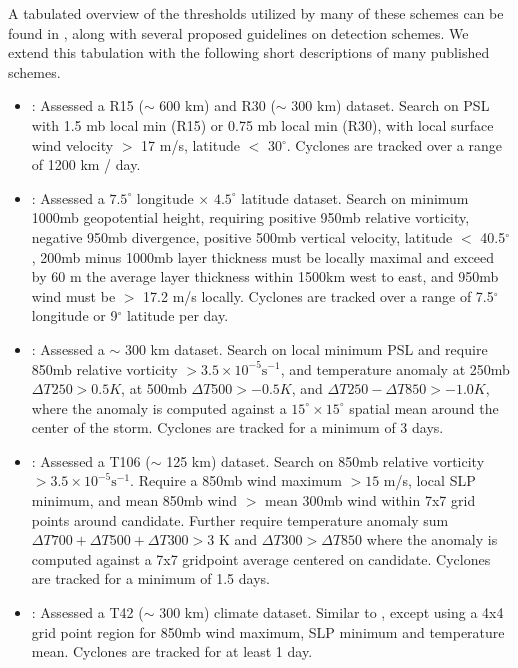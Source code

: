 \documentclass[gmdd, hvmath, online]{copernicus_discussions}
\begin{document}
A tabulated overview of the thresholds utilized by many of these schemes can be found in \cite{walsh2007objectively}, along with several proposed guidelines on detection schemes.  We extend this tabulation with the following short descriptions of many published schemes.

\begin{itemize}
\item \cite{broccoli1990existing}: Assessed a R15 ($\sim$ 600 km) and R30 ($\sim$ 300 km) dataset.  Search on PSL with 1.5 mb local min (R15) or 0.75 mb local min (R30), with local surface wind velocity $>$ 17 m/s, latitude $<$ 30$^\circ$.  Cyclones are tracked over a range of 1200 km / day.

\item \cite{wu1992gcm}: Assessed a $7.5^\circ$ longitude $\times$ $4.5^\circ$ latitude dataset.  Search on minimum 1000mb geopotential height, requiring positive 950mb relative vorticity, negative 950mb divergence, positive 500mb vertical velocity, latitude $<$ 40.5$^\circ$, 200mb minus 1000mb layer thickness must be locally maximal and exceed by 60 m the average layer thickness within 1500km west to east, and 950mb wind must be $>$ 17.2 m/s locally.  Cyclones are tracked over a range of 7.5$^\circ$ longitude or 9$^\circ$ latitude per day.

\item \cite{haarsma1993tropical}: Assessed a $\sim$ 300 km dataset.  Search on local minimum PSL and require 850mb relative vorticity $> 3.5 \times 10^{-5} \mbox{s}^{-1}$, and temperature anomaly at 250mb $\Delta T250 > 0.5 K$, at 500mb $\Delta T500 > -0.5 K$, and $\Delta T250 - \Delta T850 > -1.0 K$, where the anomaly is computed against a $15^\circ \times 15^\circ$ spatial mean around the center of the storm.  Cyclones are tracked for a minimum of 3 days.

\item \cite{bengtsson1995hurricane, bengtsson1996will}:  Assessed a T106 ($\sim$ 125 km) dataset.  Search on 850mb relative vorticity $> 3.5 \times 10^{-5} \mbox{s}^{-1}$.  Require a 850mb wind maximum $> 15$ m/s, local SLP minimum, and mean 850mb wind $>$ mean 300mb wind within 7x7 grid points around candidate.  Further require temperature anomaly sum $\Delta T700+ \Delta T500+ \Delta T300 > 3$ K and $\Delta T300 > \Delta T850$ where the anomaly is computed against a 7x7 gridpoint average centered on candidate.  Cyclones are tracked for a minimum of 1.5 days.

\item \cite{krishnamurti1998impact}:  Assessed a T42 ($\sim$ 300 km) climate dataset.  Similar to \cite{bengtsson1995hurricane, bengtsson1996will}, except using a 4x4 grid point region for 850mb wind maximum, SLP minimum and temperature mean.  Cyclones are tracked for at least 1 day.


\end{itemize}
\end{document}
